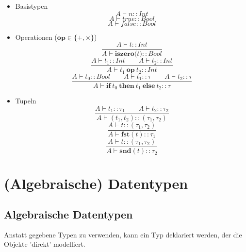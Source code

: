 \documentclass[german,10pt, a4paper, twocolumn]{scrartcl}
\theoremstyle{definition}
\theoremstyle{remark}
\begin{document}
\begin{itemize}
	\item Basistypen
		\begin{displaymath}
			A \vdash n :: Int
		\end{displaymath}
		\begin{displaymath}
			A\vdash true :: Bool
		\end{displaymath}
		\begin{displaymath}
			A \vdash false :: Bool
		\end{displaymath}
	\item Operationen ($\mathbf{op}\in \{+,\times\}$)
		\begin{displaymath}
			\frac{A \vdash t :: Int}{A\vdash \mathbf{iszero(}t\mathbf{)}:: Bool}
		\end{displaymath}
		\begin{displaymath}
			\frac{A \vdash t_1 :: Int \qquad A \vdash t_2 :: Int}{A \vdash t_1\ \mathbf{op}\ t_2 :: Int}
		\end{displaymath}
		\begin{displaymath}
			\frac{A\vdash t_0 :: Bool \qquad A \vdash t_1 :: \tau \qquad A \vdash t_2 :: \tau}{A\vdash \mathbf{if }\ t_0\ \mathbf{then}\ t_1\ \mathbf{else}\ t_2 :: \tau}
		\end{displaymath}
	\item Tupeln
		\begin{displaymath}
			\frac{A \vdash t_1 :: \tau_1 \qquad A \vdash t_2 :: \tau_2}{A\vdash (t_1,t_2)::(\tau_1,\tau_2)}
		\end{displaymath}
		\begin{displaymath}
			\frac{A\vdash t::(\tau_1,\tau_2)}{A \vdash \mathbf{fst}(t)::\tau_1}
		\end{displaymath}
		\begin{displaymath}
			\frac{A\vdash t::(\tau_1,\tau_2)}{A \vdash \mathbf{snd}(t)::\tau_2}
		\end{displaymath}
\end{itemize}

\section{(Algebraische) Datentypen}

\subsection{Algebraische Datentypen}

Anstatt gegebene Typen zu verwenden, kann ein Typ deklariert werden, der die Objekte 'direkt' modelliert.
\end{document}

